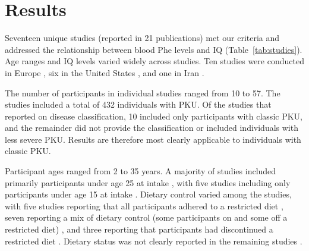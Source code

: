 \documentclass{svjour3}                     %
\begin{document}
\section{Results} %
\label{sec:Results}

Seventeen unique studies (reported in 21 publications) met our criteria and addressed the relationship between blood Phe levels and IQ (Table~\ref{tab:studies}). Age ranges and IQ levels varied widely across studies. Ten studies were conducted in Europe \citep{Cerone:1999vf, Griffiths:2000ti, Jones:1995vw, Leuzzi:1998um, Pfaendner:2005uo, Rupp:2001jg, Schmidt:1994wx, Weglage:2001us, Weglage:2000wf, Weglage:1999tr}, six in the United States \citep{Anastasoaie:2008hv, Ris:1997vv, Seashore:1985wf, Viau:2011he, WASSERSTEIN:2006bv, Welsh:1990uw}, and one in Iran \citep{Azadi:2009ha}.

The number of participants in individual studies ranged from 10 to 57. The studies included a total of 432 individuals with PKU. Of the studies that reported on disease classification, 10 included only participants with classic PKU, and the remainder did not provide the classification or included individuals with less severe PKU. Results are therefore most clearly applicable to individuals with classic PKU.

Participant ages ranged from 2 to 35 years. A majority of studies included primarily participants under age 25 at intake \citep{Anastasoaie:2008hv, Azadi:2009ha, Cerone:1999vf, Griffiths:2000ti, Leuzzi:1998um, Ris:1997vv, Schmidt:1994wx, Seashore:1985wf, Weglage:2000wf, Weglage:1999tr, Welsh:1990uw, Viau:2011he}, with five studies including only participants under age 15 at intake \citep{Cerone:1999vf, Griffiths:2000ti, Seashore:1985wf, Weglage:1999tr, Welsh:1990uw}. Dietary control varied among the studies, with five studies reporting that all participants adhered to a restricted diet \citep{Anastasoaie:2008hv, Azadi:2009ha, Griffiths:2000ti, WASSERSTEIN:2006bv, Welsh:1990uw}, seven reporting a mix of dietary control (some participants on and some off a restricted diet) \citep{Jones:1995vw, Leuzzi:1998um, Pfaendner:2005uo, Ris:1997vv, Rupp:2001jg, Schmidt:1994wx, Viau:2011he}, and three reporting that participants had discontinued a restricted diet \citep{Cerone:1999vf, Seashore:1985wf, Weglage:2001us}. Dietary status was not clearly reported in the remaining studies \citep{Weglage:2000wf, Weglage:1999tr}.
\end{document}
